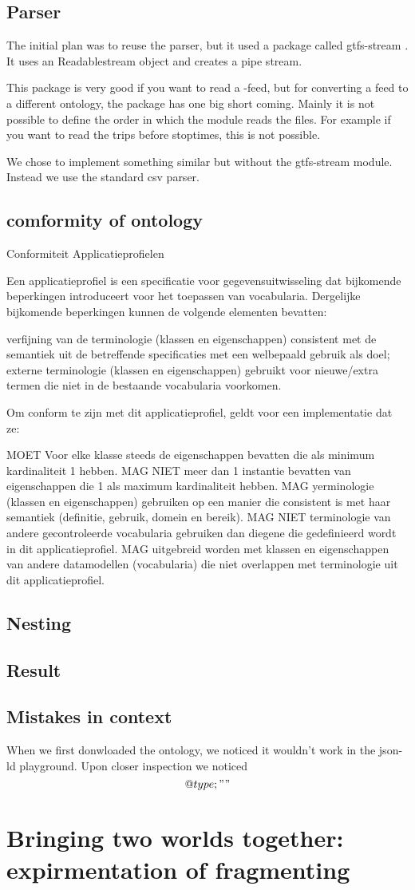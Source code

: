 \subsection{Parser}
The initial plan was to reuse the parser, but it used a package called gtfs-stream \cite{noauthor_staecogtfs-stream_2024}. It uses an Readablestream object and creates a pipe stream. 

This package is very good if you want to read a -feed, but for converting a feed to a different ontology, the package has one big short coming. Mainly it is not possible to define the order in which the module reads the files. For example if you want to read the trips before stoptimes, this is not possible.

We chose to implement something similar but without the gtfs-stream module. Instead we use the standard csv parser. 
\subsection{comformity of ontology}
\cite{noauthor_conformiteit_nodate}
Conformiteit Applicatieprofielen

Een applicatieprofiel is een specificatie voor gegevensuitwisseling dat bijkomende beperkingen introduceert voor het toepassen van vocabularia. Dergelijke bijkomende beperkingen kunnen de volgende elementen bevatten:

    verfijning van de terminologie (klassen en eigenschappen) consistent met de semantiek uit de betreffende specificaties met een welbepaald gebruik als doel;
    externe terminologie (klassen en eigenschappen) gebruikt voor nieuwe/extra termen die niet in de bestaande vocabularia voorkomen.

Om conform te zijn met dit applicatieprofiel, geldt voor een implementatie dat ze:

    MOET Voor elke klasse steeds de eigenschappen bevatten die als minimum kardinaliteit 1 hebben.
    MAG NIET meer dan 1 instantie bevatten van eigenschappen die 1 als maximum kardinaliteit hebben.
    MAG yerminologie (klassen en eigenschappen) gebruiken op een manier die consistent is met haar semantiek (definitie, gebruik, domein en bereik).
    MAG NIET terminologie van andere gecontroleerde vocabularia gebruiken dan diegene die gedefinieerd wordt in dit applicatieprofiel.
    MAG uitgebreid worden met klassen en eigenschappen van andere datamodellen (vocabularia) die niet overlappen met terminologie uit dit applicatieprofiel.

\subsection{Nesting}
\subsection{Result}
\subsection{Mistakes in context}
When we first donwloaded the ontology, we noticed it wouldn't work in the json-ld playground. Upon closer inspection we noticed 
$$@type; ""$$
\section{Bringing two worlds together: expirmentation of fragmenting}

